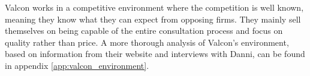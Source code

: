 Valcon works in a competitive environment where the competition is well known, meaning they know what they can expect from opposing firms. 
They mainly sell themselves on being capable of the entire consultation process and focus on quality rather than price. 
A more thorough analysis of Valcon's environment, based on information from their website and interviews with Danni, can be found in appendix \ref{app:valcon_environment}.